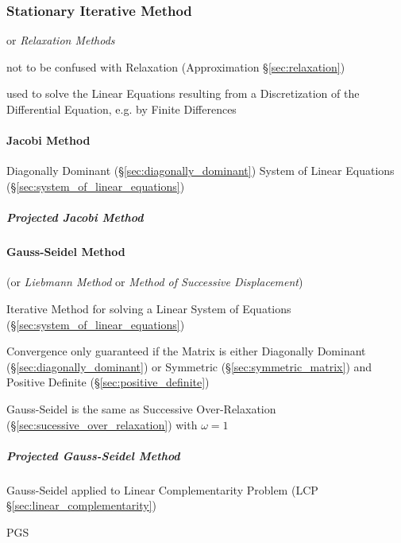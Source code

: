 \subsubsection{Stationary Iterative Method}
\label{sec:stationary_iterative}

or \emph{Relaxation Methods}

\fist not to be confused with Relaxation (Approximation \S\ref{sec:relaxation})

used to solve the Linear Equations resulting from a Discretization of the
Differential Equation, e.g. by Finite Differences



\paragraph{Jacobi Method}\label{sec:jacobi_method}\hfill

Diagonally Dominant (\S\ref{sec:diagonally_dominant}) System of Linear
Equations (\S\ref{sec:system_of_linear_equations})



\subparagraph{Projected Jacobi Method}
\label{sec:projected_jacobi_method}



\paragraph{Gauss-Seidel Method}\label{sec:gauss_seidel}\hfill

(or \emph{Liebmann Method} or \emph{Method of Successive
  Displacement})

Iterative Method for solving a Linear System of Equations
(\S\ref{sec:system_of_linear_equations})

Convergence only guaranteed if the Matrix is either Diagonally
Dominant (\S\ref{sec:diagonally_dominant}) or Symmetric
(\S\ref{sec:symmetric_matrix}) and Positive Definite
(\S\ref{sec:positive_definite})

Gauss-Seidel is the same as Successive Over-Relaxation
(\S\ref{sec:sucessive_over_relaxation}) with $\omega = 1$



\subparagraph{Projected Gauss-Seidel Method}\hfill
\label{sec:projected_gauss_seidel}

Gauss-Seidel applied to Linear Complementarity Problem (LCP
\S\ref{sec:linear_complementarity})

PGS



